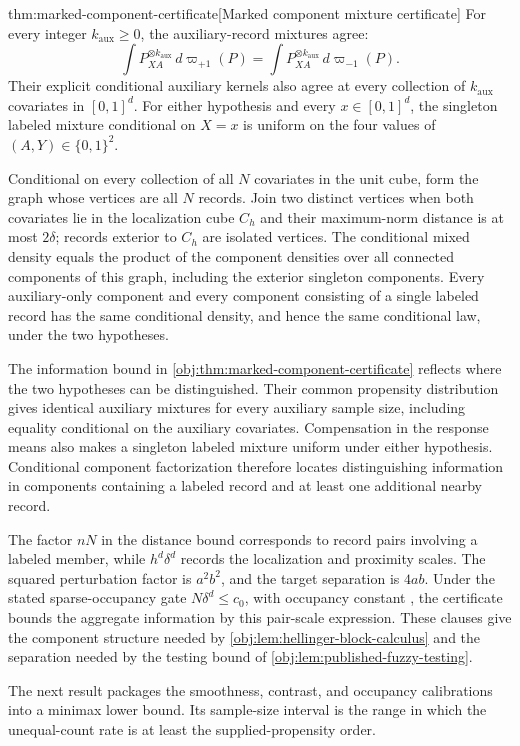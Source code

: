 \begin{theoremv}{thm:marked-component-certificate}[Marked component mixture certificate]
For every integer \(k_{\mathrm{aux}}\ge0\), the auxiliary-record mixtures agree:
\[
\int P_{XA}^{\otimes k_{\mathrm{aux}}}\,d\varpi_{+1}(P)
=
\int P_{XA}^{\otimes k_{\mathrm{aux}}}\,d\varpi_{-1}(P).
\]
Their explicit conditional auxiliary kernels also agree at every collection of \(k_{\mathrm{aux}}\) covariates in \([0,1]^d\). For either hypothesis and every \(x\in[0,1]^d\), the singleton labeled mixture conditional on \(X=x\) is uniform on the four values of \((A,Y)\in\{0,1\}^2\).

Conditional on every collection of all \(N\) covariates in the unit cube, form the graph whose vertices are all \(N\) records. Join two distinct vertices when both covariates lie in the localization cube \(C_h\) and their maximum-norm distance is at most \(2\delta\); records exterior to \(C_h\) are isolated vertices. The conditional mixed density equals the product of the component densities over all connected components of this graph, including the exterior singleton components. Every auxiliary-only component and every component consisting of a single labeled record has the same conditional density, and hence the same conditional law, under the two hypotheses.
\end{theoremv}

The information bound in \cref{obj:thm:marked-component-certificate} reflects where the two hypotheses can be distinguished. Their common propensity distribution gives identical auxiliary mixtures for every auxiliary sample size, including equality conditional on the auxiliary covariates. Compensation in the response means also makes a singleton labeled mixture uniform under either hypothesis. Conditional component factorization therefore locates distinguishing information in components containing a labeled record and at least one additional nearby record.

The factor \(nN\) in the distance bound corresponds to record pairs involving a labeled member, while \(h^d\delta^d\) records the localization and proximity scales. The squared perturbation factor is \(a^2b^2\), and the target separation is \(4ab\). Under the stated sparse-occupancy gate \(N\delta^d\le c_0\), with occupancy constant , the certificate bounds the aggregate information by this pair-scale expression. These clauses give the component structure needed by \cref{obj:lem:hellinger-block-calculus} and the separation needed by the testing bound of \cref{obj:lem:published-fuzzy-testing}.

The next result packages the smoothness, contrast, and occupancy calibrations into a minimax lower bound. Its sample-size interval is the range in which the unequal-count rate is at least the supplied-propensity order.

